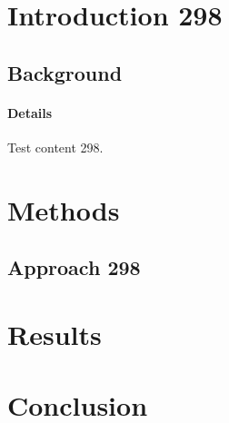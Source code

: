 \documentclass{article}
\begin{document}
\section{Introduction 298}
\subsection{Background}
\paragraph{Details} Test content 298.
\section{Methods}
\subsection{Approach 298}
\section{Results}
\section{Conclusion}
\end{document}
